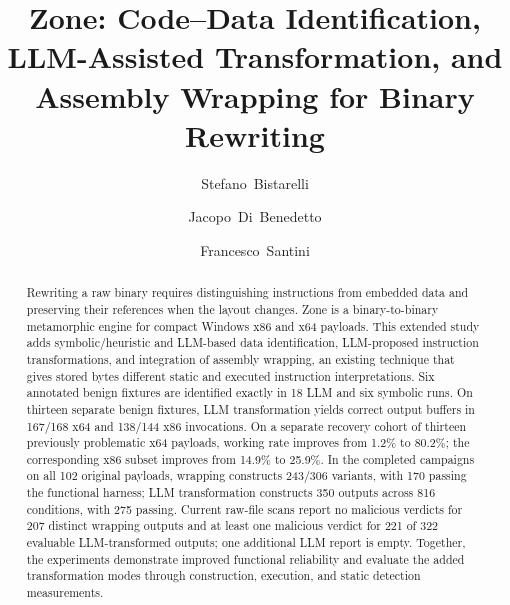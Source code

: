 \documentclass[runningheads]{llncs}
\begin{document}
\title{Zone: Code--Data Identification, LLM-Assisted Transformation, and Assembly Wrapping for Binary Rewriting}
\author{Stefano~Bistarelli \and
Jacopo~Di~Benedetto \and
Francesco~Santini}
\maketitle

\begin{abstract}
Rewriting a raw binary requires distinguishing instructions from embedded
data and preserving their references when the layout changes. Zone is a
binary-to-binary metamorphic engine for compact Windows x86 and x64
payloads. This extended study adds symbolic/heuristic and LLM-based data
identification, LLM-proposed instruction transformations, and integration
of assembly wrapping, an existing technique that gives stored bytes
different static and executed instruction interpretations. Six annotated
benign fixtures are identified exactly in 18 LLM and six symbolic runs.
On thirteen separate benign fixtures, LLM transformation yields correct
output buffers in 167/168 x64 and 138/144 x86 invocations. On a separate recovery cohort of thirteen previously problematic x64
payloads, working rate improves from 1.2\% to 80.2\%; the corresponding
x86 subset improves from 14.9\% to 25.9\%. In the completed campaigns
on all 102 original payloads,
wrapping constructs 243/306 variants, with 170 passing the functional
harness; LLM transformation constructs 350 outputs across 816 conditions,
with 275 passing. Current raw-file scans report no malicious verdicts for
207 distinct wrapping outputs and at least one malicious verdict for
221 of 322 evaluable LLM-transformed outputs; one additional LLM report
is empty. Together, the experiments demonstrate improved functional reliability
and evaluate the added transformation modes through construction, execution,
and static detection measurements.
\end{abstract}
\end{document}
